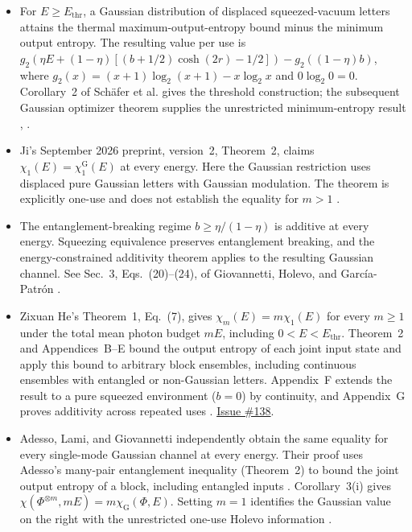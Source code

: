 \begin{itemize}
  \item For $E\geq E_{\mathrm{thr}}$, a Gaussian distribution of displaced squeezed-vacuum letters attains the thermal maximum-output-entropy bound minus the minimum output entropy. The resulting value per use is $g_2(\eta E+(1-\eta)[(b+1/2)\cosh(2r)-1/2])-g_2((1-\eta)b)$, where $g_2(x)=(x+1)\log_2(x+1)-x\log_2x$ and $0\log_2 0=0$. Corollary~2 of Sch\"afer et al. gives the threshold construction; the subsequent Gaussian optimizer theorem supplies the unrestricted minimum-entropy result , .

  \item Ji's September 2026 preprint, version~2, Theorem~2, claims $\chi_1(E)=\chi_1^{\mathrm G}(E)$ at every energy. Here the Gaussian restriction uses displaced pure Gaussian letters with Gaussian modulation. The theorem is explicitly one-use and does not establish the equality for $m>1$ .

  \item The entanglement-breaking regime $b\geq\eta/(1-\eta)$ is additive at every energy. Squeezing equivalence preserves entanglement breaking, and the energy-constrained additivity theorem applies to the resulting Gaussian channel. See Sec.~3, Eqs.~(20)--(24), of Giovannetti, Holevo, and Garc\'ia-Patr\'on .

  \item Zixuan He's Theorem~1, Eq.~(7), gives $\chi_m(E)=m\chi_1(E)$ for every $m\geq1$ under the total mean photon budget $mE$, including $0<E<E_{\mathrm{thr}}$. Theorem~2 and Appendices~B--E bound the output entropy of each joint input state and apply this bound to arbitrary block ensembles, including continuous ensembles with entangled or non-Gaussian letters. Appendix~F extends the result to a pure squeezed environment ($b=0$) by continuity, and Appendix~G proves additivity across repeated uses . \href{https://github.com/Naixu-Guo/quantum-open-problems/issues/138}{Issue \#138}.

  \item Adesso, Lami, and Giovannetti independently obtain the same equality for every single-mode Gaussian channel at every energy. Their proof uses Adesso's many-pair entanglement inequality (Theorem~2) to bound the joint output entropy of a block, including entangled inputs . Corollary~3(i) gives $\chi(\Phi^{\otimes m},mE)=m\chi_{\mathrm G}(\Phi,E)$. Setting $m=1$ identifies the Gaussian value on the right with the unrestricted one-use Holevo information .
\end{itemize}

